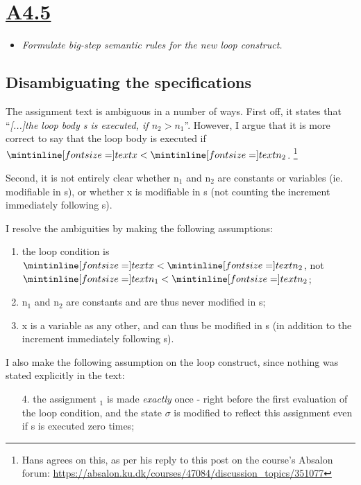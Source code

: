 \newpage
\section{\underline{A4.5}}

\begin{itemize}
  \item \emph{Formulate big-step semantic rules for the new \emph{} loop
    construct.}
\end{itemize}


\subsection{Disambiguating the specifications}

The assignment text is ambiguous in a number of ways. First off, it states that
``\emph{[...]the loop body s is executed, if $n_2 > n_1$}''. However, I argue
that it is more correct to say that the loop body is executed if $\ms x < \ms
n_2$. \footnote{Hans agrees on this, as per his reply to this post on the
course's Absalon forum:
\url{https://absalon.ku.dk/courses/47084/discussion_topics/351077}}

Second, it is not entirely clear whether \ms n$_1$ and \ms n$_2$ are constants
or variables (ie. modifiable in \ms s), or whether \ms x is modifiable in \ms s
(not counting the increment immediately following \ms s).

\medskip

\noindent I resolve the ambiguities by making the following assumptions:

\begin{enumerate}

  \item the loop condition is $\ms x < \ms n_2$, not $\ms n_1 < \ms n_2$;

  \item \ms n$_1$ and \ms n$_2$ are constants and are thus never modified in
    \ms s;

  \item \ms x is a variable as any other, and can thus be modified in \ms s (in
    addition to the increment immediately following \ms s).

\end{enumerate}

I also make the following assumption on the loop construct, since nothing was
stated explicitly in the text:

\begin{itemize}
  \item[4.] the assignment $_1$ is made \emph{exactly} once - right
    before the first evaluation of the loop condition, and the state $\sigma$ is modified
    to reflect this assignment even if \ms s is executed zero times;
\end{itemize}



